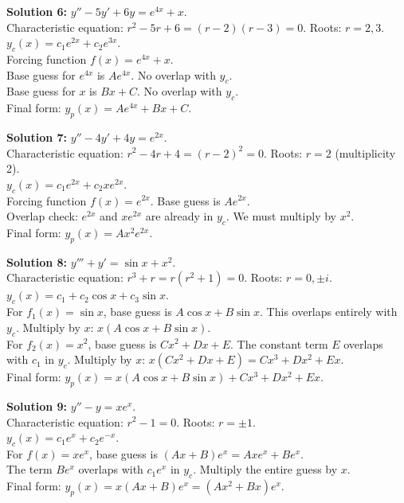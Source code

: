 \documentclass[11pt]{article}
\begin{document}
\textbf{Solution 6:} $y'' - 5y' + 6y = e^{4x} + x$. \\
Characteristic equation: $r^2 - 5r + 6 = (r-2)(r-3) = 0$. Roots: $r=2, 3$. \\
$y_c(x) = c_1 e^{2x} + c_2 e^{3x}$. \\
Forcing function $f(x) = e^{4x} + x$. \\
Base guess for $e^{4x}$ is $A e^{4x}$. No overlap with $y_c$. \\
Base guess for $x$ is $Bx + C$. No overlap with $y_c$. \\
Final form: $y_p(x) = A e^{4x} + Bx + C$.

\textbf{Solution 7:} $y'' - 4y' + 4y = e^{2x}$. \\
Characteristic equation: $r^2 - 4r + 4 = (r-2)^2 = 0$. Roots: $r=2$ (multiplicity 2). \\
$y_c(x) = c_1 e^{2x} + c_2 x e^{2x}$. \\
Forcing function $f(x) = e^{2x}$. Base guess is $A e^{2x}$. \\
Overlap check: $e^{2x}$ and $x e^{2x}$ are already in $y_c$. We must multiply by $x^2$. \\
Final form: $y_p(x) = A x^2 e^{2x}$.

\textbf{Solution 8:} $y''' + y' = \sin x + x^2$. \\
Characteristic equation: $r^3 + r = r(r^2 + 1) = 0$. Roots: $r=0, \pm i$. \\
$y_c(x) = c_1 + c_2 \cos x + c_3 \sin x$. \\
For $f_1(x) = \sin x$, base guess is $A \cos x + B \sin x$. This overlaps entirely with $y_c$. Multiply by $x$: $x(A \cos x + B \sin x)$. \\
For $f_2(x) = x^2$, base guess is $Cx^2 + Dx + E$. The constant term $E$ overlaps with $c_1$ in $y_c$. Multiply by $x$: $x(Cx^2 + Dx + E) = Cx^3 + Dx^2 + Ex$. \\
Final form: $y_p(x) = x(A \cos x + B \sin x) + Cx^3 + Dx^2 + Ex$.

\textbf{Solution 9:} $y'' - y = x e^x$. \\
Characteristic equation: $r^2 - 1 = 0$. Roots: $r = \pm 1$. \\
$y_c(x) = c_1 e^x + c_2 e^{-x}$. \\
For $f(x) = x e^x$, base guess is $(Ax + B)e^x = A x e^x + B e^x$. \\
The term $B e^x$ overlaps with $c_1 e^x$ in $y_c$. Multiply the entire guess by $x$. \\
Final form: $y_p(x) = x(Ax + B)e^x = (Ax^2 + Bx)e^x$.
\end{document}
